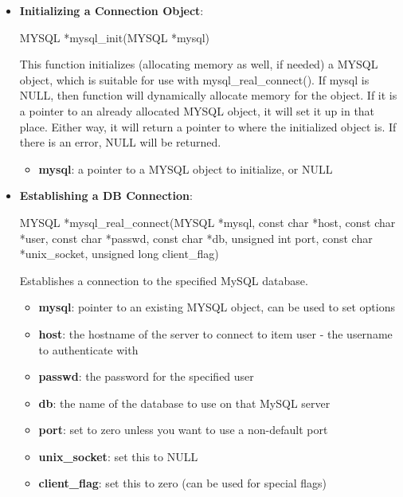 \documentclass{report}
\begin{document}
\begin{itemize}
        \item \textbf{Initializing a Connection Object}:
            \bigbreak \noindent 
            \begin{cppcode}
            MYSQL *mysql_init(MYSQL *mysql)
            \end{cppcode}
            \bigbreak \noindent 
            This function initializes (allocating memory as well, if needed) a MYSQL object, which is suitable for use with mysql\_real\_connect(). If mysql is NULL, then function will dynamically allocate memory for the object. If it is a pointer to an already allocated MYSQL object, it will set it up in that place. Either way, it will return a pointer to where the initialized object is. If there is an error, NULL will be returned.
            \bigbreak \noindent 
            \begin{itemize}
                \item \textbf{mysql}: a pointer to a MYSQL object to initialize, or NULL
            \end{itemize}
        \item \textbf{Establishing a DB Connection}:
            \bigbreak \noindent 
            \begin{cppcode}
                MYSQL *mysql_real_connect(MYSQL *mysql, const char *host,
                    const char *user, const char *passwd,
                    const char *db, unsigned int port,
                    const char *unix_socket, unsigned long client_flag)
            \end{cppcode}
            \bigbreak \noindent 
            Establishes a connection to the specified MySQL database.
            \begin{itemize}
                \item \textbf{mysql}: pointer to an existing MYSQL object, can be used to set options
                \item \textbf{host}: the hostname of the server to connect to item user - the username to authenticate with
                \item \textbf{passwd}: the password for the specified user
                \item \textbf{db}: the name of the database to use on that MySQL server
                \item \textbf{port}: set to zero unless you want to use a non-default port
                \item \textbf{unix\_socket}: set this to NULL
                \item \textbf{client\_flag}: set this to zero (can be used for special flags)

\end{itemize}
\end{itemize}
\end{document}
